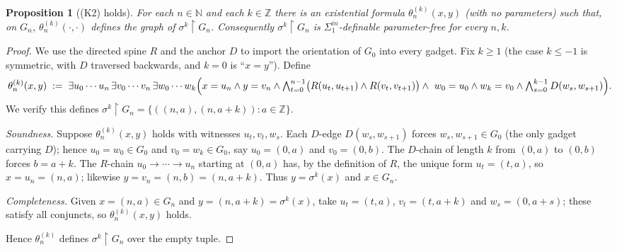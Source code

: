 \documentclass[12pt,fullpage]{article}
\newtheorem{proposition}[theorem]{Proposition}
\theoremstyle{definition}
\newcommand{\N}{\mathbb{N}}
\newcommand{\Z}{{\mathbb{Z}}}
\begin{document}
\begin{proposition}[(K2) holds]\label{prop:K2}
For each $n\in\N$ and each $k\in\Z$ there is an existential formula
$\theta_n^{(k)}(x,y)$ (with \emph{no} parameters) such that, on $G_n$,
$\theta_n^{(k)}(\cdot,\cdot)$ defines the graph of $\sigma^k\restriction G_n$.
Consequently $\sigma^k\restriction G_n$ is $\Sigma^{in}_1$-definable
parameter-free for every $n,k$.
\end{proposition}

\begin{proof}
We use the directed spine $R$ and the anchor $D$ to import the orientation of
$G_0$ into every gadget.  Fix $k\ge 1$ (the case $k\le-1$ is symmetric, with
$D$ traversed backwards, and $k=0$ is ``$x=y$'').  Define
\[
\theta_n^{(k)}(x,y)\;:=\;\exists u_0\cdots u_n\,\exists v_0\cdots v_n\,
\exists w_0\cdots w_k\Bigl(
x=u_n\wedge y=v_n\wedge\textstyle\bigwedge_{t=0}^{n-1}\bigl(R(u_t,u_{t+1})\wedge R(v_t,v_{t+1})\bigr)
\wedge\ w_0=u_0\wedge w_k=v_0\wedge\textstyle\bigwedge_{s=0}^{k-1}D(w_s,w_{s+1})\Bigr).
\]
We verify this defines $\sigma^k\restriction G_n=\{((n,a),(n,a+k)):a\in\Z\}$.

\emph{Soundness.}  Suppose $\theta_n^{(k)}(x,y)$ holds with witnesses
$u_t,v_t,w_s$.  Each $D$-edge $D(w_s,w_{s+1})$ forces $w_s,w_{s+1}\in G_0$
(the only gadget carrying $D$); hence $u_0=w_0\in G_0$ and $v_0=w_k\in G_0$,
say $u_0=(0,a)$ and $v_0=(0,b)$.  The $D$-chain of length $k$ from $(0,a)$ to
$(0,b)$ forces $b=a+k$.  The $R$-chain $u_0\to\cdots\to u_n$ starting at
$(0,a)$ has, by the definition of $R$, the unique form $u_t=(t,a)$, so
$x=u_n=(n,a)$; likewise $y=v_n=(n,b)=(n,a+k)$.  Thus $y=\sigma^k(x)$ and
$x\in G_n$.

\emph{Completeness.}  Given $x=(n,a)\in G_n$ and $y=(n,a+k)=\sigma^k(x)$, take
$u_t=(t,a)$, $v_t=(t,a+k)$ and $w_s=(0,a+s)$; these satisfy all conjuncts, so
$\theta_n^{(k)}(x,y)$ holds.

Hence $\theta_n^{(k)}$ defines $\sigma^k\restriction G_n$ over the empty tuple.
\end{proof}
\end{document}
